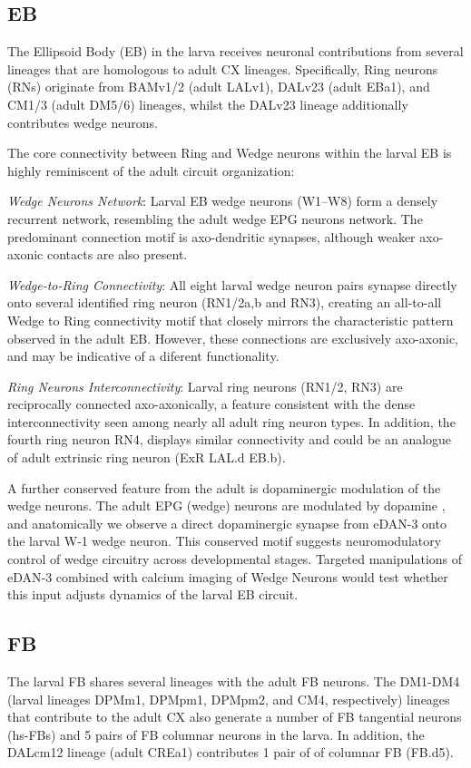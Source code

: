         \subsection{EB}
        
        The Ellipsoid Body (EB) in the larva receives neuronal contributions from several lineages that are homologous to adult CX lineages. Specifically, Ring neurons (RNs) originate from BAMv1/2 (adult LALv1), DALv23 (adult EBa1), and CM1/3 (adult DM5/6) lineages, whilst the DALv23 lineage additionally contributes wedge neurons. 

        The core connectivity between Ring and Wedge neurons within the larval EB is highly reminiscent of the adult circuit organization:  

        \textit{Wedge Neurons Network}: Larval EB wedge neurons (W1–W8) form a densely recurrent network, resembling the adult wedge EPG neurons network. The predominant connection motif is axo-dendritic synapses, although weaker axo-axonic contacts are also present. 

       \textit{Wedge-to-Ring Connectivity}: All eight larval wedge neuron pairs synapse directly onto several identified ring neuron (RN1/2a,b and RN3), creating an all-to-all Wedge to Ring connectivity motif that closely mirrors the characteristic pattern observed in the adult EB. However, these connections are exclusively axo-axonic, and may be indicative of a diferent functionality. 
       
        \textit{Ring Neurons Interconnectivity}: Larval ring neurons (RN1/2, RN3) are reciprocally connected axo-axonically, a feature consistent with the dense interconnectivity seen among nearly all adult ring neuron types. In addition, the fourth ring neuron RN4, displays similar connectivity and could be an analogue of adult extrinsic ring neuron (ExR LAL.d EB.b).
        
        A further conserved feature from the adult is dopaminergic modulation of the wedge neurons. The adult EPG (wedge) neurons are modulated by dopamine \citep{frighetto2022dopamine}, and anatomically we observe a direct dopaminergic synapse from eDAN-3 onto the larval W‑1 wedge neuron. This conserved motif suggests neuromodulatory control of wedge circuitry across developmental stages. Targeted manipulations of eDAN‑3 combined with calcium imaging of Wedge Neurons would test whether this input adjusts dynamics of the larval EB circuit. 


        \subsection{FB}
        The larval FB shares several lineages with the adult FB neurons. The DM1-DM4 (larval lineages DPMm1, DPMpm1, DPMpm2, and CM4, respectively)  lineages that contribute to the adult CX also generate a number of FB tangential neurons (hs-FBs) and 5 pairs of FB columnar neurons in the larva. In addition, the DALcm12 lineage (adult CREa1) contributes 1 pair of of columnar FB (FB.d5). 

